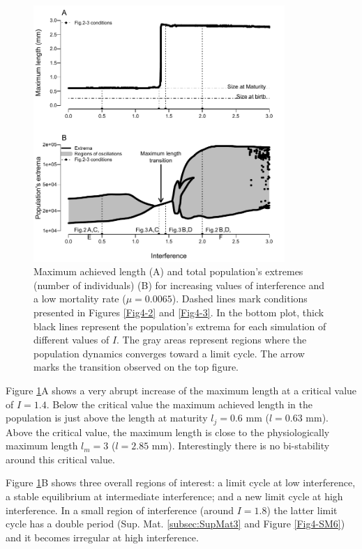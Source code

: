 \begin{figure}[!h] %
\centering
\includegraphics[width=0.85\textwidth]{4_ChapThe1/Fig/Fig1.pdf}
\caption[Bifurcation over interference]{
Maximum achieved length (A) and total population's extremes (number of
individuals) (B) for increasing values of interference and a low mortality rate
($\mu=0.0065$). Dashed lines mark conditions presented in Figures \ref{Fig4-2}
and \ref{Fig4-3}.
In the bottom plot, thick black lines represent the population's extrema for
each simulation of different values of $I$. The gray areas represent regions
where the population dynamics converges toward a limit cycle. The arrow marks
the transition observed on the top figure.}
\label{Fig4-1}
\end{figure}

Figure \ref{Fig4-1}A shows a very abrupt increase of the maximum length at a
critical value of $I = 1.4$. Below the critical value the maximum achieved
length in the population is just above the length at maturity $l_j=0.6$ mm
($l=0.63$ mm). Above the critical value, the maximum length is close to the
physiologically maximum length $l_m=3$ ($l=2.85$ mm). Interestingly there is no
bi-stability around this critical value.

Figure \ref{Fig4-1}B shows three overall regions of interest: a limit cycle at
low interference, a stable equilibrium at intermediate interference; and a new
limit cycle at high interference. In a small region of interference (around $I =
1.8$) the latter limit cycle has a double period (Sup. Mat. \ref{subsec:SupMat3} and
Figure \ref{Fig4-SM6}) and it becomes irregular at high interference.

